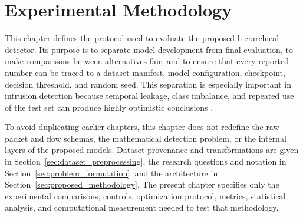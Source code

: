 \documentclass[11pt,fleqn]{report}
\begin{document}
%
%
\providecommand{\ExpPlatform}{Google Colaboratory Pro+}
\providecommand{\ExpComputeBudget}{600 purchased compute units}
\providecommand{\ExpGPU}{NVIDIA T4 (16~GB) or NVIDIA L4 (24~GB); exact model recorded per run}
\providecommand{\ExpCPU}{\textit{[insert CPU model and RAM]}}
\providecommand{\ExpOS}{Google Colab hosted Linux runtime; \textit{[insert runtime image details]}}
\providecommand{\ExpSoftware}{\textit{[insert Python, PyTorch, CUDA, and scikit-learn versions]}}
\providecommand{\ExpSuricata}{\textit{[insert Suricata version and custom-plugin revision]}}

\chapter{Experimental Methodology}
\label{sec:experimental_methodology}

This chapter defines the protocol used to evaluate the proposed hierarchical
detector. Its purpose is to separate model development from final evaluation,
to make comparisons between alternatives fair, and to ensure that every
reported number can be traced to a dataset manifest, model configuration,
checkpoint, decision threshold, and random seed. This separation is especially
important in intrusion detection because temporal leakage, class imbalance,
and repeated use of the test set can produce highly optimistic conclusions
\cite{SommerPaxson2010,Arp2022DosDonts}.

To avoid duplicating earlier chapters, this chapter does not redefine the raw
packet and flow schemas, the mathematical detection problem, or the internal
layers of the proposed models. Dataset provenance and transformations are
given in Section~\ref{sec:dataset_preprocessing}, the research questions and
notation in Section~\ref{sec:problem_formulation}, and the architecture in
Section~\ref{sec:proposed_methodology}. The present chapter specifies only the
experimental comparisons, controls, optimization protocol, metrics,
statistical analysis, and computational measurement needed to test that
methodology.
\end{document}
